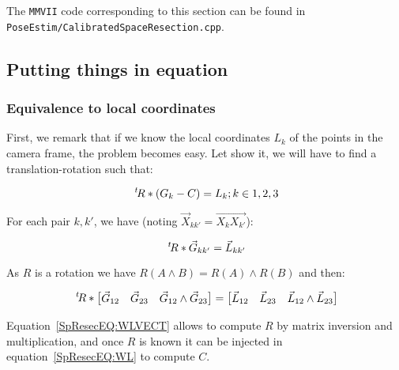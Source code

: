 The {\tt MMVII} code corresponding to this section can be found in 
{\tt PoseEstim/CalibratedSpaceResection.cpp}.


\subsection{Putting things in equation}

\subsubsection{Equivalence to local coordinates}

\label{SpRes:EquivLocCoord}

First, we remark that if we know the local coordinates $L_k$ of the points in the
camera frame, the problem becomes easy. Let show it, we will have to find a translation-rotation such that:

\begin{equation}
       \; ^{t} \! R*(G_k-C) = L_k  ; k\in{1,2,3} \label{SpResecEQ:WL}
\end{equation}


For each pair $k,k'$, we have (noting $\Vec{X}_{kk'} = \overrightarrow{X_{k}X_{k'}} $):


\begin{equation}
	\; ^{t} \! R* \Vec{G}_{kk'} =  \Vec{L}_{kk'} \label{SpResecEQ:WLVECT}
\end{equation}

As  $R$ is a rotation we have $R(A \wedge  B) = R(A) \wedge   R(B) $ and then:

\begin{equation}
	\; ^{t} \! R* \begin{bmatrix} \Vec{G}_{12} & \Vec{G}_{23} &  \Vec{G}_{12} \wedge \Vec{G}_{23} \end{bmatrix} 
        =  \begin{bmatrix} \Vec{L}_{12} & \Vec{L}_{23} &  \Vec{L}_{12} \wedge \Vec{L}_{23} \end{bmatrix} 
        \label{SpResecEQ:WLVECT}
\end{equation}

Equation~\ref{SpResecEQ:WLVECT} allows to compute $R$ by matrix inversion and multiplication, and 
once $R$ is known it can be injected in equation~\ref{SpResecEQ:WL} to compute $C$.

